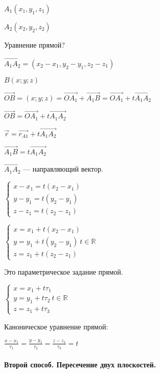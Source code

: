 \documentclass{article}
\begin{document}
    \( A_1(x_1, y_1, z_1) \)

    \( A_2(x_2, y_2, z_2) \)

    Уравнение прямой?

    \( \overrightarrow{A_1A_2} = (x_2 - x_1, y_2 - y_1, z_2 - z_1) \)


    \( B(x; y; z) \)

    \( \overrightarrow{OB} = (x; y; z) = \overrightarrow{OA_1} + \overrightarrow{A_1B} = \overrightarrow{OA_1} + t\overrightarrow{A_1A_2}\)

    \( \overrightarrow{OB} = \overrightarrow{OA_1} + t\overrightarrow{A_1A_2} \)

    \( \overrightarrow{r} = \overrightarrow{r_{A1}} + t\overrightarrow{A_1A_2} \)

    \( \overrightarrow{A_1B} = t\overrightarrow{A_1A_2} \)

    \(\overrightarrow{A_1A_2}\) --- направляющий вектор.

    \( \begin{cases}
        x - x_1 = t(x_2 - x_1)\\ 
        y - y_1 = t(y_2 - y_1)\\
        z - z_1 = t(z_2 - z_1)
    \end{cases} \)

    \( \begin{cases}
        x = x_1 + t(x_2 - x_1)\\ 
        y = y_1 + t(y_2 - y_1)\ t \in \mathbb{R}\\
        z = z_1 + t(z_2 - z_1)
    \end{cases} \)

    Это параметрическое задание прямой.

    \(\begin{cases}
        x = x_1 + t\tau_1\\
        y = y_1 + t\tau_2\ t \in \mathbb{R}\\
        z = z_1 + t\tau_3
    \end{cases}\)

    Каноническое уравнение прямой: 
    
    \(\frac{x-x_1}{\tau_1} = \frac{y-y_1}{\tau_2} = \frac{z-z_1}{\tau_3} = t\)

    \paragraph*{Второй способ. Пересечение двух плоскостей.}\mbox{}\\
    
\end{document}
